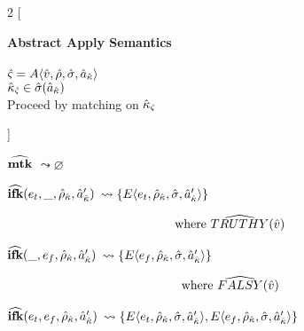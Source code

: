 \documentclass[12pt,draft]{article}
\newcommand{\E}[4]{E\langle #1 , #2 , #3 , #4 \rangle}
\newcommand{\A}[4]{A\langle #1 , #2 , #3 , #4 \rangle}
\begin{document}

\begin{multicols*}{2}
  [
  \begin{center}
    \textbf{Abstract Apply Semantics} \\ \;\\
    $\astate = \A{\aval}{\aenv}{\astore}{\akaddr}$ \\
    $\hat{\kappa}_{\hat{\varsigma}} \in \hat{\sigma}(\hat{a}_{\hat{\kappa}})$ \\
    Proceed by matching on $\hat{\kappa}_{\hat{\varsigma}}$
  \end{center}
  ]
  \begin{center}
    $\widehat{\textbf{mtk}}$
    $\leadsto \varnothing$
  \end{center}
  \begin{center}
    $\widehat{\textbf{ifk}}(e_t , \_ , \hat{\rho}_{\hat{\kappa}} , \hat{a}_{\hat{\kappa}}')$
    $\leadsto \{\E{e_t}{\aenv_{\akont}}{\astore}{\akaddr'}\}$
  \end{center}
  \vspace{-7mm}
  \begin{align*}
    \text{where } \widehat{TRUTHY}(\hat{v})
  \end{align*}
  \begin{center}
    $\widehat{\textbf{ifk}}(\_ , e_f , \hat{\rho}_{\hat{\kappa}} , \hat{a}_{\hat{\kappa}}')$
    $\leadsto \{\E{e_f}{\aenv_{\akont}}{\astore}{\akaddr'}\}$
  \end{center}
  \vspace{-7mm}
  \begin{align*}
    \text{where } \widehat{FALSY}(\hat{v})
  \end{align*}
  \begin{center}
    $\widehat{\textbf{ifk}}(e_t , e_f , \hat{\rho}_{\hat{\kappa}} , \hat{a}_{\hat{\kappa}}')$
    $\leadsto \{\E{e_t}{\aenv_{\akont}}{\astore}{\akaddr'} ,
                \E{e_f}{\aenv_{\akont}}{\astore}{\akaddr'}\}$

\end{center}
\end{multicols*}
\end{document}
